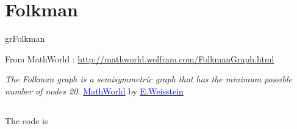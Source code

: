 \newpage\section{Folkman}\label{folkman}
\begin{NewMacroBox}{grFolkman}{}

\medskip
From MathWorld : \url{http://mathworld.wolfram.com/FolkmanGraph.html}

\emph{The Folkman graph is a semisymmetric graph that has the minimum possible number of nodes 20.} 
\href{http://mathworld.wolfram.com/topics/GraphTheory.html}%
           {\textcolor{blue}{MathWorld}} by \href{http://en.wikipedia.org/wiki/Eric_W._Weisstein}%
           {\textcolor{blue}{E.Weisstein}}
\end{NewMacroBox}


\subsection{}
The code is

\begin{tkzexample}
\end{tkzexample}

\begin{center}
\begin{tkzexample}[vbox]
\end{tkzexample} 
\end{center}

\vfill\newpage


\subsection{}
\begin{center}
\begin{tkzexample}[vbox]
\end{tkzexample} 
\end{center}

